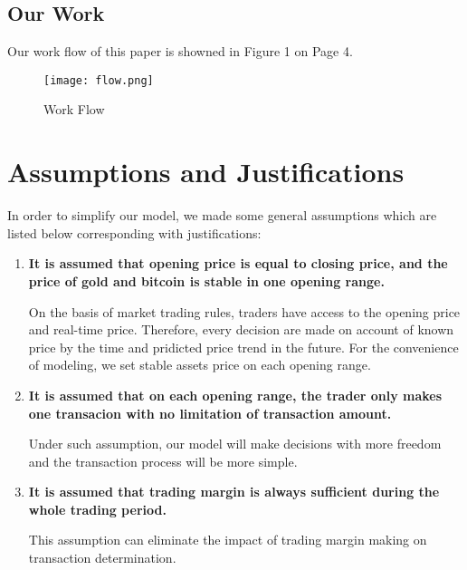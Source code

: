 \documentclass{mcmthesis}
\begin{document}
\newpage
\subsection{Our Work}
Our work flow of this paper is showned in Figure 1 on Page 4.
\begin {figure} [htbp]
\centering
\texttt{[image: flow.png]}
\caption{Work Flow}
\end {figure}


\section{Assumptions and Justifications}
In order to simplify our model, we made some general assumptions which are listed below corresponding with justifications:
\begin{enumerate}
\setlength{\leftmargin}{0pt}
\item \textbf{It is assumed that opening price is equal to closing price, and the price of gold and bitcoin is stable in one opening range.}\par On the basis of market trading rules, traders have access to the opening price and real-time price. Therefore, every decision are made on account of known price by the time and pridicted price trend in the future. For the convenience of modeling, we set stable assets price on each opening range.
\item \textbf{It is assumed that on each opening range, the trader only makes one transacion with no limitation of transaction amount.}\par Under such assumption, our model will make decisions with more freedom and the transaction process will be more simple.
\item \textbf{It is assumed that trading margin is always sufficient during the whole trading period.}\par This assumption can eliminate the impact of trading margin making on transaction determination.
\end{enumerate}
\end{document}
